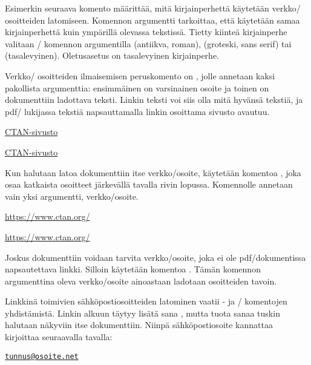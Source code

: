 Esimerkin seuraava komento  määrittää, mitä
kirjainperhettä käytetään verkko\-/ osoitteiden latomiseen. Komennon
argumentti  tarkoittaa, että käytetään samaa kirjainperhettä
kuin ympärillä olevassa tekstissä. Tietty kiinteä kirjainperhe valitaan
\-/ komennon argumentilla  (antiikva,
roman),  (groteski, sans serif) tai  (tasalevyinen).
Oletusasetus on tasalevyinen kirjainperhe.

Verkko\-/ osoitteiden ilmaisemisen peruskomento on ,
jolle annetaan kaksi pakollista argumenttia: ensimmäinen on varsinainen
osoite ja toinen on dokumenttiin ladottava teksti. Linkin teksti voi
siis olla mitä hyvänsä tekstiä, ja pdf\-/ lukijassa tekstiä
napsauttamalla linkin osoittama sivusto avautuu.

\begin{koodilohkosis}
  \href{https://www.ctan.org/}{CTAN-sivusto}
\end{koodilohkosis}

\begin{tulossis}
  \href{https://www.ctan.org/}{CTAN-sivusto}
\end{tulossis}

Kun halutaan latoa dokumenttiin itse verkko\-/osoite, käytetään komentoa
,  joka osaa katkaista osoitteet
järkevällä tavalla rivin lopussa. Komennolle annetaan vain yksi
argumentti, verkko\-/osoite.

\begin{koodilohkosis}
  \url{https://www.ctan.org/}
\end{koodilohkosis}

\begin{tulossis}
  \url{https://www.ctan.org/}
\end{tulossis}

Joskus dokumenttiin voidaan tarvita verkko\-/osoite, joka ei ole
pdf\-/dokumentissa napsautettava linkki. Silloin käytetään komentoa
. Tämän komennon argumenttina oleva verkko\-/osoite
ainoastaan ladotaan osoitteiden tavoin.

Linkkinä toimivien sähköpostiosoitteiden latominen vaatii
- ja \-/ komentojen yhdistämistä.
Linkin alkuun täytyy lisätä sana , mutta tuota sanaa
tuskin halutaan näkyviin itse dokumenttiin. Niinpä sähköpostiosoite
kannattaa kirjoittaa seuraavalla tavalla:

\begin{koodilohkosis}
  \href{mailto:tunnus@osoite.net}{\nolinkurl{tunnus@osoite.net}}
\end{koodilohkosis}

